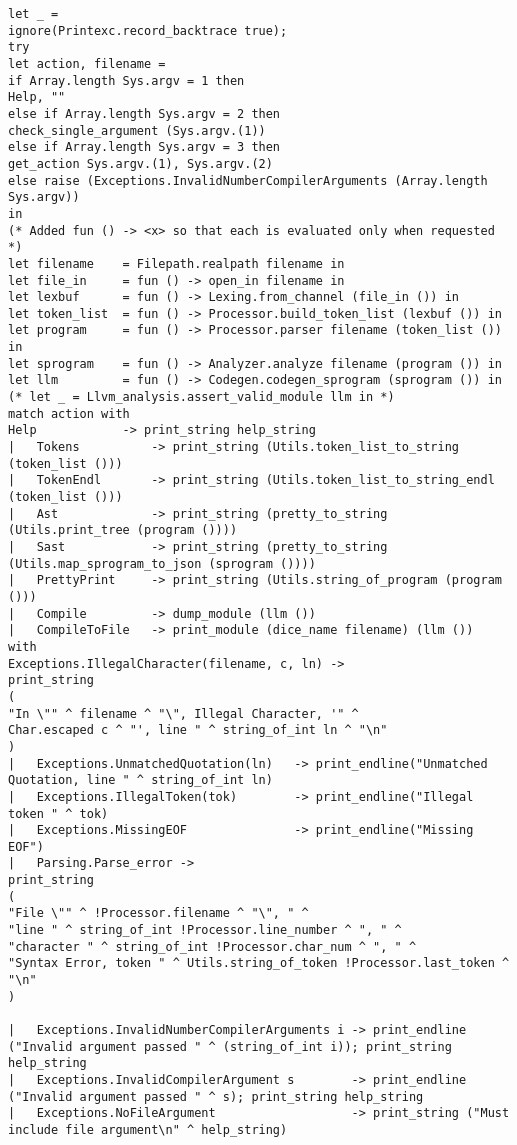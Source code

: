 \begin{verbatim}
let _ =
ignore(Printexc.record_backtrace true);
try
let action, filename = 
if Array.length Sys.argv = 1 then
Help, ""
else if Array.length Sys.argv = 2 then
check_single_argument (Sys.argv.(1))
else if Array.length Sys.argv = 3 then 
get_action Sys.argv.(1), Sys.argv.(2)
else raise (Exceptions.InvalidNumberCompilerArguments (Array.length Sys.argv)) 
in 
(* Added fun () -> <x> so that each is evaluated only when requested *)
let filename 	= Filepath.realpath filename in
let file_in 	= fun () -> open_in filename in
let lexbuf 		= fun () ->	Lexing.from_channel (file_in ()) in
let token_list 	= fun () -> Processor.build_token_list (lexbuf ()) in
let program 	= fun () -> Processor.parser filename (token_list ()) in
let sprogram 	= fun () -> Analyzer.analyze filename (program ()) in
let llm 		= fun () -> Codegen.codegen_sprogram (sprogram ()) in
(* let _ = Llvm_analysis.assert_valid_module llm in *)
match action with
Help 			-> print_string help_string
| 	Tokens 			-> print_string (Utils.token_list_to_string (token_list ()))
| 	TokenEndl 		-> print_string (Utils.token_list_to_string_endl (token_list ()))
| 	Ast 			-> print_string (pretty_to_string  (Utils.print_tree (program ())))
| 	Sast 			-> print_string (pretty_to_string (Utils.map_sprogram_to_json (sprogram ())))
| 	PrettyPrint 	-> print_string (Utils.string_of_program (program ()))
| 	Compile 		-> dump_module (llm ())
| 	CompileToFile 	-> print_module (dice_name filename) (llm ())
with 
Exceptions.IllegalCharacter(filename, c, ln) ->
print_string
(
"In \"" ^ filename ^ "\", Illegal Character, '" ^
Char.escaped c ^ "', line " ^ string_of_int ln ^ "\n"
)
| 	Exceptions.UnmatchedQuotation(ln) 	-> print_endline("Unmatched Quotation, line " ^ string_of_int ln)
| 	Exceptions.IllegalToken(tok) 		-> print_endline("Illegal token " ^ tok)
| 	Exceptions.MissingEOF 				-> print_endline("Missing EOF")
| 	Parsing.Parse_error ->
print_string
(
"File \"" ^ !Processor.filename ^ "\", " ^
"line " ^ string_of_int !Processor.line_number ^ ", " ^
"character " ^ string_of_int !Processor.char_num ^ ", " ^
"Syntax Error, token " ^ Utils.string_of_token !Processor.last_token ^ "\n" 
)

|  	Exceptions.InvalidNumberCompilerArguments i -> print_endline ("Invalid argument passed " ^ (string_of_int i)); print_string help_string
| 	Exceptions.InvalidCompilerArgument s 		-> print_endline ("Invalid argument passed " ^ s); print_string help_string
| 	Exceptions.NoFileArgument 					-> print_string ("Must include file argument\n" ^ help_string)


\end{verbatim}
